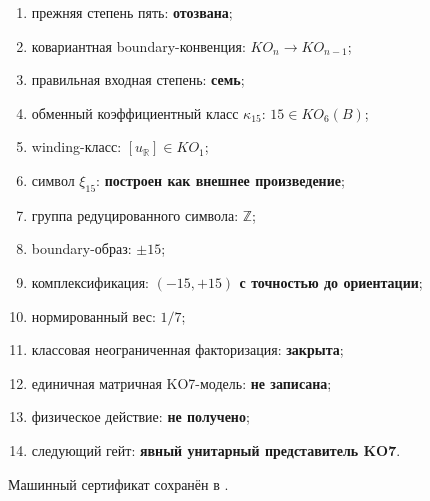 \begin{protocol}
\begin{enumerate}
 \item прежняя степень пять: \textbf{отозвана};
 \item ковариантная boundary-конвенция: \textbf{$KO_n\to KO_{n-1}$};
 \item правильная входная степень: \textbf{семь};
 \item обменный коэффициентный класс $\kappa_{15}$:
 \textbf{$15\in KO_6(B)$};
 \item winding-класс: \textbf{$[u_{\mathbb R}]\in KO_1$};
 \item символ $\xi_{15}$: \textbf{построен как внешнее произведение};
 \item группа редуцированного символа: \textbf{$\mathbb Z$};
 \item boundary-образ: \textbf{$\pm15$};
 \item комплексификация: \textbf{$(-15,+15)$ с точностью до ориентации};
 \item нормированный вес: \textbf{$1/7$};
 \item классовая неограниченная факторизация: \textbf{закрыта};
 \item единичная матричная KO7-модель: \textbf{не записана};
 \item физическое действие: \textbf{не получено};
 \item следующий гейт: \textbf{явный унитарный представитель KO7}.
\end{enumerate}
\end{protocol}

Машинный сертификат сохранён в
.